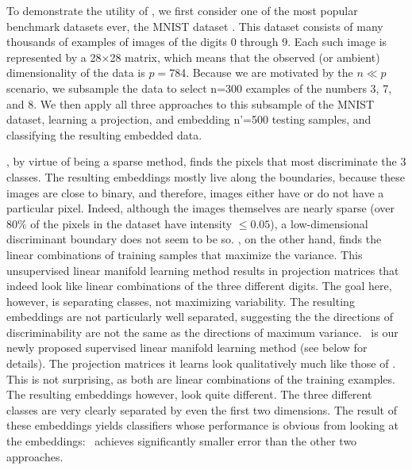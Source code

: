 \documentclass[10pt]{article}
\begin{document}
To demonstrate the utility of \Lol, we  first consider one of the most popular benchmark datasets ever, the MNIST dataset \cite{mnist}.  This dataset consists of many thousands of examples of images of the digits 0 through 9.  Each such image is represented by a 28$\times$28 matrix, which means that the observed (or ambient) dimensionality of the data is $p=$784.  Because we are motivated by the $n \ll p$ scenario, we subsample the data to select n=300 examples of the numbers 3, 7, and 8. We then apply all three approaches to this subsample of the MNIST dataset, learning a projection, and embedding n'=500 testing samples, and classifying the resulting embedded data.

, by virtue of being a sparse method, finds the pixels that most discriminate the 3 classes.  The resulting embeddings mostly live along the boundaries, because these images are close to binary, and therefore, images either have or do not have a particular pixel. Indeed, although the images themselves are nearly sparse (over 80\% of the pixels in the dataset have intensity $\leq 0.05$),  a low-dimensional discriminant boundary does not seem to be so.  \Pca, on the other hand, finds the linear combinations of training samples that maximize the variance.  This unsupervised linear manifold learning method results in projection matrices that indeed look like linear combinations of the three different digits.  The goal here, however, is separating classes, not maximizing variability.  The resulting embeddings are not particularly well separated, suggesting the the directions of discriminability are not the same as the directions of maximum variance.  \Lol~is our newly proposed supervised linear manifold learning method (see below for details).  The projection matrices it learns look qualitatively much like those of \Pca. This is not surprising, as both are linear combinations of the training examples.  The resulting embeddings however, look quite different.  The three different classes are very clearly separated by even the first two dimensions.  The result of these embeddings yields classifiers whose performance is obvious from looking at the embeddings: \Lol~achieves significantly smaller error than the other two approaches.  
\end{document}
